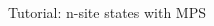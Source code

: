 \begin{frame}[fragile]{Tutorial: n-site states with MPS}
\begin{columns}
\begin{column}{4.5cm}
\end{column}

\end{columns}

\end{frame}
